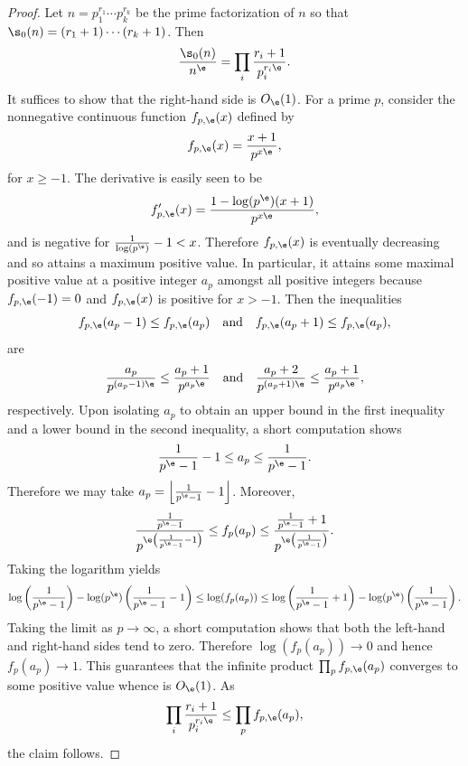 \documentclass[12pt]{article}
\begin{document}
      \begin{proof}
        Let \(n = p_{1}^{r_{1}} \cdots p_{k}^{r_{k}}\) be the prime factorization of \(n\) so that \(\s_{0}(n) = (r_{1}+1) \cdots (r_{k}+1)\). Then
        \[
          \frac{\s_{0}(n)}{n^{\e}} = \prod_{i}\frac{r_{i}+1}{p_{i}^{r_{i}\e}}.
        \]
        It suffices to show that the right-hand side is \(O_{\e}(1)\). For a prime \(p\), consider the nonnegative continuous function \(f_{p,\e}(x)\) defined by
        \[
          f_{p,\e}(x) = \frac{x+1}{p^{x\e}},
        \]
        for \(x \ge -1\). The derivative is easily seen to be
        \[
          f_{p,\e}'(x) = \frac{1-\log(p^{\e})(x+1)}{p^{x\e}},
        \]
        and is negative for \(\frac{1}{\log(p^{\e})}-1 < x\). Therefore \(f_{p,\e}(x)\) is eventually decreasing and so attains a maximum positive value. In particular, it attains some maximal positive value at a positive integer \(a_{p}\) amongst all positive integers because \(f_{p,\e}(-1) = 0\) and \(f_{p,\e}(x)\) is positive for \(x > -1\). Then the inequalities
        \[
          f_{p,\e}(a_{p}-1) \le f_{p,\e}(a_{p}) \quad \text{and} \quad f_{p,\e}(a_{p}+1) \le f_{p,\e}(a_{p}),
        \]
        are
        \[
          \frac{a_{p}}{p^{(a_{p}-1)\e}} \le \frac{a_{p}+1}{p^{a_{p}\e}} \quad \text{and} \quad \frac{a_{p}+2}{p^{(a_{p}+1)\e}} \le \frac{a_{p}+1}{p^{a_{p}\e}},
        \]
        respectively. Upon isolating \(a_{p}\) to obtain an upper bound in the first inequality and a lower bound in the second inequality, a short computation shows
        \[
          \frac{1}{p^{\e}-1}-1 \le a_{p} \le \frac{1}{p^{\e}-1}.
        \]
        Therefore we may take \(a_{p} = \left\lfloor \frac{1}{p^{\e}-1}-1 \right\rfloor\). Moreover,
        \[
          \frac{\frac{1}{p^{\e}-1}}{p^{\e\left(\frac{1}{p^{\e}-1}-1\right)}} \le f_{p}(a_{p}) \le \frac{\frac{1}{p^{\e}-1}+1}{p^{\e\left(\frac{1}{p^{\e}-1}\right)}}.
        \]
        Taking the logarithm yields
        \[
          \log\left(\frac{1}{p^{\e}-1}\right)-\log(p^{\e})\left(\frac{1}{p^{\e}-1}-1\right) \le \log(f_{p}(a_{p})) \le \log\left(\frac{1}{p^{\e}-1}+1\right)-\log(p^{\e})\left(\frac{1}{p^{\e}-1}\right).
        \]
        Taking the limit as \(p \to \infty\), a short computation shows that both the left-hand and right-hand sides tend to zero. Therefore \(\log(f_{p}(a_{p})) \to 0\) and hence \(f_{p}(a_{p}) \to 1\). This guarantees that the infinite product \(\prod_{p}f_{p,\e}(a_{p})\) converges to some positive value whence is \(O_{\e}(1)\). As
        \[
          \prod_{i}\frac{r_{i}+1}{p_{i}^{r_{i}\e}} \le \prod_{p}f_{p,\e}(a_{p}),
        \]
        the claim follows.
      \end{proof}
\end{document}
